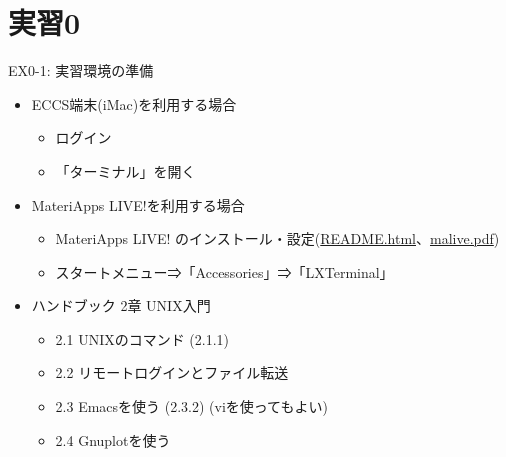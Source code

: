 \section{実習0}

\begin{frame}[t,fragile]{EX0-1: 実習環境の準備}
  \begin{itemize}
    \setlength{\itemsep}{1em}
  \item[0-1-1] ECCS端末(iMac)を利用する場合
    \begin{itemize}
    \item ログイン
    \item 「ターミナル」を開く
    \end{itemize}
  \item[0-1-2] MateriApps LIVE!を利用する場合
    \begin{itemize}
    \item MateriApps LIVE! のインストール・設定(\href{https://github.com/cmsi/MateriAppsLive/wiki/MateriAppsLive-ltx}{README.html}、\href{http://www.slideshare.net/cms_initiative/materiapps-live-52477264}{malive.pdf})
    \item スタートメニュー⇒「Accessories」⇒「LXTerminal」
    \end{itemize}
  \item[0-1-3] ハンドブック 2章 UNIX入門
    \begin{itemize}
    \item 2.1 UNIXのコマンド (2.1.1)
    \item 2.2 リモートログインとファイル転送
    \item 2.3 Emacsを使う (2.3.2) (viを使ってもよい)
    \item 2.4 Gnuplotを使う
    \end{itemize}
  \end{itemize}
\end{frame}


